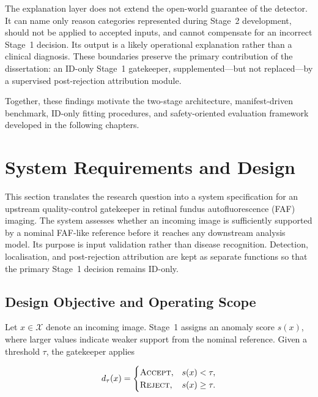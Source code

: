 \documentclass[fleqn,12pt]{olplainarticle}
\begin{document}
The explanation layer does not extend the open-world guarantee of the detector. It can name only reason categories represented during Stage~2 development, should not be applied to accepted inputs, and cannot compensate for an incorrect Stage~1 decision. Its output is a likely operational explanation rather than a clinical diagnosis. These boundaries preserve the primary contribution of the dissertation: an ID-only Stage~1 gatekeeper, supplemented---but not replaced---by a supervised post-rejection attribution module.

Together, these findings motivate the two-stage architecture, manifest-driven benchmark, ID-only fitting procedures, and safety-oriented evaluation framework developed in the following chapters.

\newpage

\section{System Requirements and Design}
\label{sec:system_design}

This section translates the research question into a system specification for
an upstream quality-control gatekeeper in retinal fundus autofluorescence
(FAF) imaging. The system assesses whether an incoming image is sufficiently
supported by a nominal FAF-like reference before it reaches any downstream
analysis model. Its purpose is input validation rather than disease
recognition. Detection, localisation, and post-rejection attribution are kept
as separate functions so that the primary Stage~1 decision remains ID-only.

\subsection{Design Objective and Operating Scope}
\label{subsec:design_objective}

Let $x\in\mathcal{X}$ denote an incoming image. Stage~1 assigns an anomaly
score $s(x)$, where larger values indicate weaker support from the nominal
reference. Given a threshold $\tau$, the gatekeeper applies

\begin{equation}
    d_{\tau}(x)=
    \begin{cases}
        \textsc{Accept}, & s(x)<\tau,\\
        \textsc{Reject}, & s(x)\geq\tau.
    \end{cases}
    \label{eq:system_gate_rule}
\end{equation}
\end{document}
